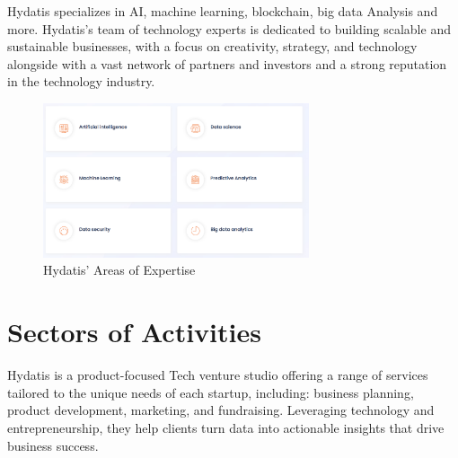 \documentclass[12pt,a4paper,oneside,english]{book}
\begin{document}
Hydatis specializes in AI, machine learning, blockchain, big data Analysis and more. Hydatis's team of technology experts is dedicated to building scalable and sustainable businesses, with a focus on creativity, strategy, and technology alongside with a vast network of partners and investors and a strong reputation in the technology industry.
\begin{figure}[h!] %
    \centering
    \includegraphics[width=0.699\textwidth]{images/Expertise_hydatis.png}
    \caption{Hydatis' Areas of Expertise}
    \label{fig:Expertise_hydatis}
\end{figure}

\section{Sectors of Activities}%
Hydatis is a product-focused Tech venture studio offering a range of services tailored to the unique needs of each startup, including:
 business planning, product development, marketing, and fundraising. 
Leveraging technology and entrepreneurship, they help clients turn data into actionable insights that drive business success.
\end{document}
